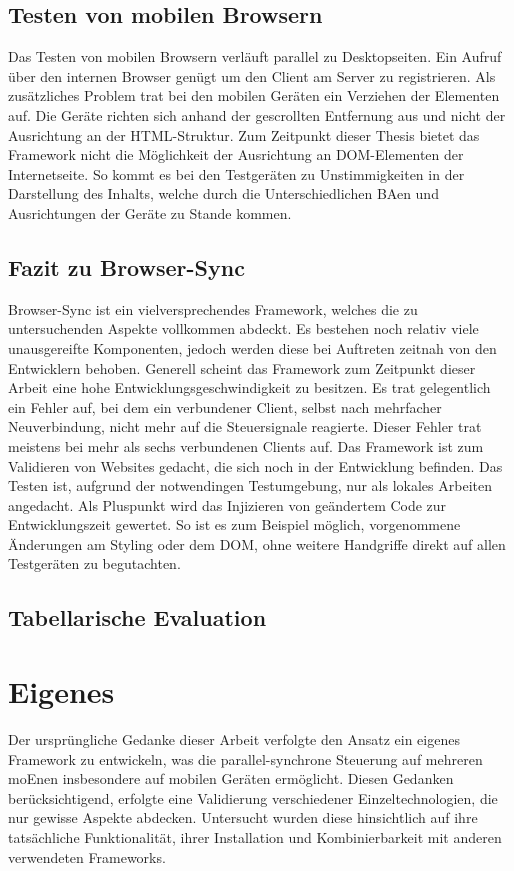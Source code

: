 	\subsection{Testen von mobilen Browsern}
	Das Testen von mobilen Browsern verläuft parallel zu Desktopseiten. Ein Aufruf über den internen Browser genügt um den Client am Server zu registrieren. Als zusätzliches Problem trat bei den mobilen Geräten ein Verziehen der Elementen auf. Die Geräte richten sich anhand der gescrollten Entfernung aus und nicht der Ausrichtung an der \Gls{HTML}-Struktur. Zum Zeitpunkt dieser Thesis bietet das \Gls{Framework} nicht die Möglichkeit der Ausrichtung an \Gls{DOM}-Elementen der Internetseite. So kommt es bei den Testgeräten zu Unstimmigkeiten in der Darstellung des Inhalts, welche durch die Unterschiedlichen \Gls{BA}en und Ausrichtungen der Geräte zu Stande kommen.
	
	\subsection{Fazit zu Browser-Sync}
	Browser-Sync ist ein vielversprechendes \Gls{Framework}, welches die zu untersuchenden Aspekte vollkommen abdeckt. Es bestehen noch relativ viele unausgereifte Komponenten, jedoch werden diese bei Auftreten zeitnah von den Entwicklern behoben. Generell scheint das \Gls{Framework} zum Zeitpunkt dieser Arbeit eine hohe Entwicklungsgeschwindigkeit zu besitzen. Es trat gelegentlich ein Fehler auf, bei dem ein verbundener Client, selbst nach mehrfacher Neuverbindung, nicht mehr auf die Steuersignale reagierte. Dieser Fehler trat meistens bei mehr als sechs verbundenen Clients auf. Das \Gls{Framework} ist zum Validieren von Websites gedacht, die sich noch in der Entwicklung befinden. Das Testen ist, aufgrund der notwendingen Testumgebung, nur als lokales Arbeiten angedacht. Als Pluspunkt wird das Injizieren von geändertem Code zur Entwicklungszeit gewertet. So ist es zum Beispiel möglich, vorgenommene Änderungen am Styling oder dem \Gls{DOM}, ohne weitere Handgriffe direkt auf allen Testgeräten zu begutachten.
	
	\subsection{Tabellarische Evaluation}
	
	
	\section{Eigenes }
	Der ursprüngliche Gedanke dieser Arbeit verfolgte den Ansatz ein eigenes \Gls{Framework} zu entwickeln, was die \Gls{parallel-synchron}e Steuerung auf mehreren \Gls{moEn}en insbesondere auf mobilen Geräten ermöglicht. Diesen Gedanken berücksichtigend, erfolgte eine Validierung verschiedener Einzeltechnologien, die nur gewisse Aspekte abdecken. Untersucht wurden diese hinsichtlich auf ihre tatsächliche Funktionalität, ihrer Installation und Kombinierbarkeit mit anderen verwendeten \Gls{Framework}s.
	
